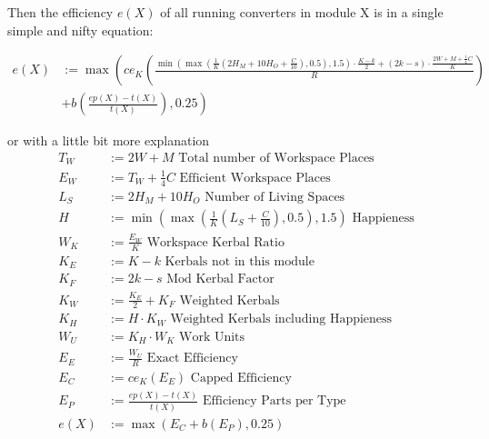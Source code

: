 \documentclass[11pt]{report}
\begin{document}
Then the efficiency $e(X)$ of all running converters in module X is in
a single simple and nifty equation:

\begin{align*}
  e(X) & := \max\left(ce_K\left(\frac{\min\left(\max\left(\frac{1}{K}\left(2H_M+10H_O+\frac{C}{10}\right), 0.5\right), 1.5\right)\cdot \frac{K - k}{2}+(2k-s)\cdot \frac{2W+M+\frac{1}{4}C}{K}}{R}\right)\right.\\
    & \left.+ b\left(\frac{ep(X)-t(X)}{t(X)}\right), 0.25\right)
\end{align*}

or with a little bit more explanation
\begin{align*}
  T_W & := 2W+M \textrm{ Total number of Workspace Places}\\
  E_W & := T_W+\frac{1}{4}C \textrm{ Efficient Workspace Places}\\
  L_S & := 2H_M+10H_O \textrm{ Number of Living Spaces}\\
  H & := \min\left(\max\left(\frac{1}{K}\left(L_S+\frac{C}{10}\right), 0.5\right), 1.5\right) \textrm{ Happieness}\\
  W_K & := \frac{E_W}{K} \textrm{ Workspace Kerbal Ratio}\\
  K_E & := K - k \textrm{ Kerbals not in this module}\\
  K_F & := 2k-s \textrm{ Mod Kerbal Factor}\\
  K_W & := \frac{K_E}{2}+K_F \textrm{ Weighted Kerbals}\\
  K_H & := H\cdot K_W \textrm{ Weighted Kerbals including Happieness}\\
  W_U & := K_H\cdot W_K \textrm{ Work Units}\\
  E_E & := \frac{W_U}{R} \textrm{ Exact Efficiency}\\
  E_C & := ce_K(E_E) \textrm{ Capped Efficiency}\\
  E_P & := \frac{ep(X)-t(X)}{t(X)} \textrm{ Efficiency Parts per Type}\\
  e(X) & := \max(E_C+b(E_P), 0.25)
\end{align*}
\end{document}
